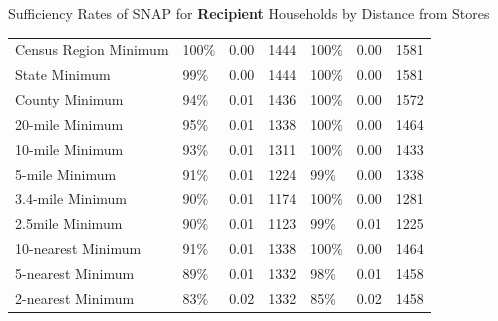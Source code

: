 \documentclass{beamer}
\begin{document}
\begin{frame}
\begin{table}[htbp]{Sufficiency Rates of SNAP for \textbf{Recipient} Households by Distance from Stores}
\begin{adjustbox}{height=1.5in}
\begin{tabular}{lllllll}
    Census Region Minimum & 100\% & 0.00  & 1444  & 100\% & 0.00  & 1581 \\
    State Minimum & 99\%  & 0.00  & 1444  & 100\% & 0.00  & 1581 \\
    County Minimum & 94\%  & 0.01  & 1436  & 100\% & 0.00  & 1572 \\
    20-mile Minimum & 95\%  & 0.01  & 1338  & 100\% & 0.00  & 1464 \\
    10-mile Minimum & 93\%  & 0.01  & 1311  & 100\% & 0.00  & 1433 \\
    5-mile Minimum & 91\%  & 0.01  & 1224  & 99\%  & 0.00  & 1338 \\
    3.4-mile Minimum & 90\%  & 0.01  & 1174  & 100\% & 0.00  & 1281 \\
    2.5mile Minimum & 90\%  & 0.01  & 1123  & 99\%  & 0.01  & 1225 \\
    10-nearest Minimum & 91\%  & 0.01  & 1338  & 100\% & 0.00  & 1464 \\
    5-nearest Minimum & 89\%  & 0.01  & 1332  & 98\%  & 0.01  & 1458 \\
    2-nearest Minimum & 83\%  & 0.02  & 1332  & 85\%  & 0.02  & 1458 \\
    \bottomrule
    \end{tabular}
    \end{adjustbox}
	\end{table}

\end{frame}



\end{document}

